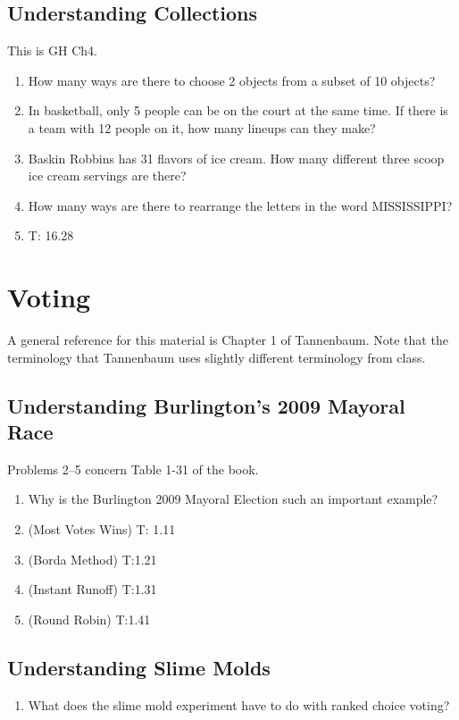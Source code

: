 \documentclass[11pt, letterpaper]{article}
\begin{document}
\subsection{Understanding Collections}
This is GH Ch4. 
\begin{enumerate}
	\item How many ways are there to choose 2 objects from a subset of 10 objects?
	\item In basketball, only 5 people can be on the court at the same time. 
	If there is a team with 12 people on it, how many lineups can they make?
	\item Baskin Robbins has 31 flavors of ice cream. How many different three scoop ice cream servings are there? 
	\item How many ways are there to rearrange the letters in the word MISSISSIPPI? 
	\item T: 16.28
\end{enumerate}
\newpage

\section{Voting} 
A general reference for this material is Chapter 1 of Tannenbaum.
Note that the terminology that Tannenbaum uses slightly different terminology from class. 

\subsection{Understanding Burlington's 2009 Mayoral Race }

\noindent Problems 2--5 concern Table 1-31 of the book.
\begin{enumerate}
	\item Why is the Burlington 2009 Mayoral Election such an important example?
	\item (Most Votes Wins) T: 1.11
	\item (Borda Method) T:1.21
	\item (Instant Runoff) T:1.31
	\item (Round Robin) T:1.41
\end{enumerate}

\subsection{Understanding Slime Molds}
\begin{enumerate}
	\item What does the slime mold experiment have to do with ranked choice voting?
\end{enumerate}
\end{document}
